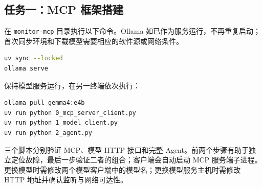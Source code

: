 \documentclass[12pt,a4paper]{ctexart}
\newcommand{\subtask}{任务一：MCP 框架搭建}
\begin{document}
\subsection*{\subtask}
在 \texttt{monitor-mcp} 目录执行以下命令。Ollama 如已作为服务运行，不再重复启动；首次同步环境和下载模型需要相应的软件源或网络条件。
\begin{lstlisting}[language=bash]
uv sync --locked
ollama serve
\end{lstlisting}
保持模型服务运行，在另一终端依次执行：
\begin{lstlisting}[language=bash]
ollama pull gemma4:e4b
uv run python 0_mcp_server_client.py
uv run python 1_model_client.py
uv run python 2_agent.py
\end{lstlisting}
三个脚本分别验证 MCP、模型 HTTP 接口和完整 Agent。前两个步骤有助于独立定位故障，最后一步验证二者的组合；客户端会自动启动 MCP 服务端子进程。更换模型时需修改两个模型客户端中的模型名；更换模型服务主机时需修改 HTTP 地址并确认监听与网络可达性。
\end{document}
